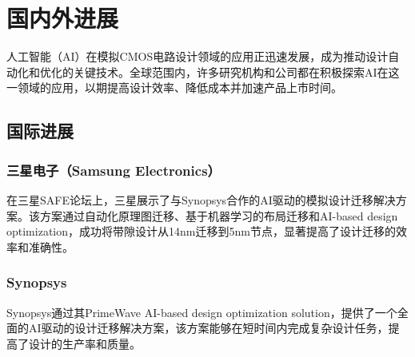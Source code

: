 %
%
%
%
%

\chapter{国内外进展}

人工智能（AI）在模拟CMOS电路设计领域的应用正迅速发展，成为推动设计自动化和优化的关键技术。全球范围内，许多研究机构和公司都在积极探索AI在这一领域的应用，以期提高设计效率、降低成本并加速产品上市时间。

\section{国际进展}

\subsection{三星电子（Samsung Electronics）}

在三星SAFE论坛上，三星展示了与Synopsys合作的AI驱动的模拟设计迁移解决方案。该方案通过自动化原理图迁移、基于机器学习的布局迁移和AI-based design optimization，成功将带隙设计从14nm迁移到5nm节点，显著提高了设计迁移的效率和准确性。

\subsection{Synopsys}

Synopsys通过其PrimeWave AI-based design optimization solution，提供了一个全面的AI驱动的设计迁移解决方案，该方案能够在短时间内完成复杂设计任务，提高了设计的生产率和质量。




